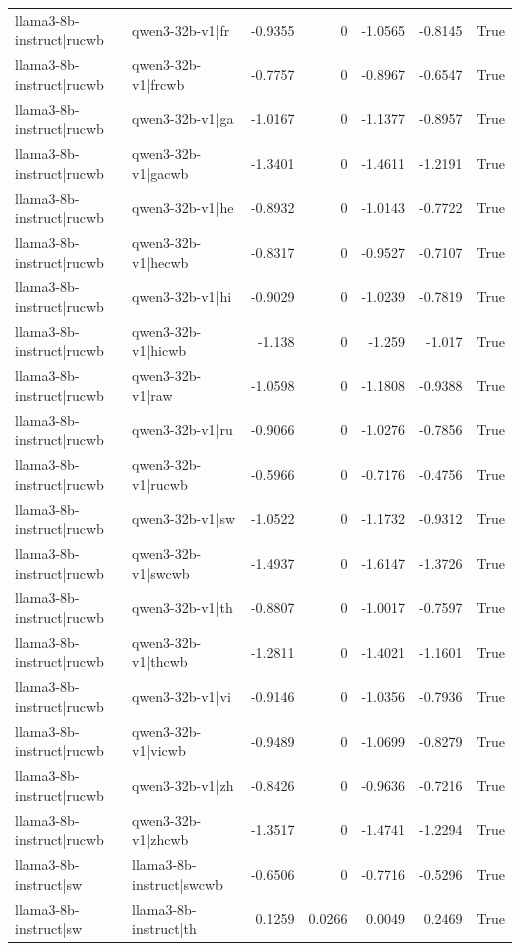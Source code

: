 \begin{table}
\begin{tabular}{l l r r r r l}
llama3-8b-instruct|rucwb & qwen3-32b-v1|fr & -0.9355 & 0 & -1.0565 & -0.8145 & True \\
llama3-8b-instruct|rucwb & qwen3-32b-v1|frcwb & -0.7757 & 0 & -0.8967 & -0.6547 & True \\
llama3-8b-instruct|rucwb & qwen3-32b-v1|ga & -1.0167 & 0 & -1.1377 & -0.8957 & True \\
llama3-8b-instruct|rucwb & qwen3-32b-v1|gacwb & -1.3401 & 0 & -1.4611 & -1.2191 & True \\
llama3-8b-instruct|rucwb & qwen3-32b-v1|he & -0.8932 & 0 & -1.0143 & -0.7722 & True \\
llama3-8b-instruct|rucwb & qwen3-32b-v1|hecwb & -0.8317 & 0 & -0.9527 & -0.7107 & True \\
llama3-8b-instruct|rucwb & qwen3-32b-v1|hi & -0.9029 & 0 & -1.0239 & -0.7819 & True \\
llama3-8b-instruct|rucwb & qwen3-32b-v1|hicwb & -1.138 & 0 & -1.259 & -1.017 & True \\
llama3-8b-instruct|rucwb & qwen3-32b-v1|raw & -1.0598 & 0 & -1.1808 & -0.9388 & True \\
llama3-8b-instruct|rucwb & qwen3-32b-v1|ru & -0.9066 & 0 & -1.0276 & -0.7856 & True \\
llama3-8b-instruct|rucwb & qwen3-32b-v1|rucwb & -0.5966 & 0 & -0.7176 & -0.4756 & True \\
llama3-8b-instruct|rucwb & qwen3-32b-v1|sw & -1.0522 & 0 & -1.1732 & -0.9312 & True \\
llama3-8b-instruct|rucwb & qwen3-32b-v1|swcwb & -1.4937 & 0 & -1.6147 & -1.3726 & True \\
llama3-8b-instruct|rucwb & qwen3-32b-v1|th & -0.8807 & 0 & -1.0017 & -0.7597 & True \\
llama3-8b-instruct|rucwb & qwen3-32b-v1|thcwb & -1.2811 & 0 & -1.4021 & -1.1601 & True \\
llama3-8b-instruct|rucwb & qwen3-32b-v1|vi & -0.9146 & 0 & -1.0356 & -0.7936 & True \\
llama3-8b-instruct|rucwb & qwen3-32b-v1|vicwb & -0.9489 & 0 & -1.0699 & -0.8279 & True \\
llama3-8b-instruct|rucwb & qwen3-32b-v1|zh & -0.8426 & 0 & -0.9636 & -0.7216 & True \\
llama3-8b-instruct|rucwb & qwen3-32b-v1|zhcwb & -1.3517 & 0 & -1.4741 & -1.2294 & True \\
llama3-8b-instruct|sw & llama3-8b-instruct|swcwb & -0.6506 & 0 & -0.7716 & -0.5296 & True \\
llama3-8b-instruct|sw & llama3-8b-instruct|th & 0.1259 & 0.0266 & 0.0049 & 0.2469 & True \\

\end{tabular}
\end{table}
